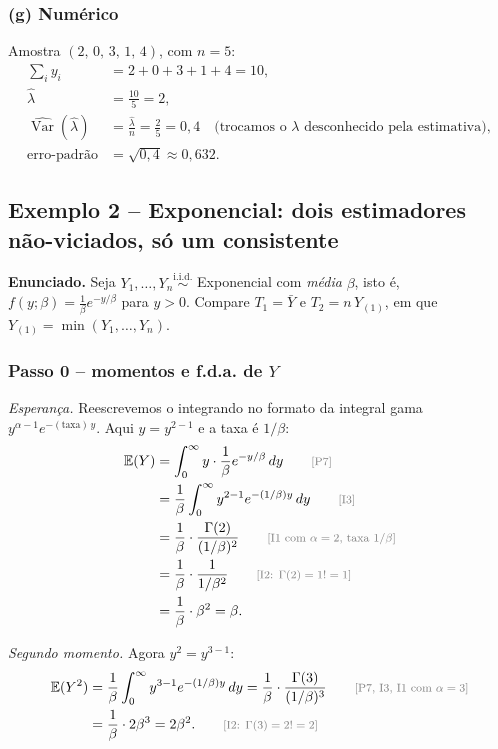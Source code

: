 \documentclass[11pt,a4paper]{article}
\theoremstyle{definition}
\theoremstyle{plain}
\newcommand{\E}{\mathbb{E}}
\newcommand{\Var}{\operatorname{Var}}
\newcommand{\iid}{\overset{\text{i.i.d.}}{\sim}}
\newcommand{\bY}{\bar{Y}}
\newcommand{\just}[1]{\tag*{\footnotesize\textcolor{gray}{[#1]}}}
\begin{document}
\subsubsection*{(g) Numérico}
Amostra $(2,\,0,\,3,\,1,\,4)$, com $n=5$:
\begin{align*}
\sum_iy_i&=2+0+3+1+4=10,\\
\hat\lambda&=\frac{10}{5}=2,\\
\widehat{\Var}(\hat\lambda)&=\frac{\hat\lambda}{n}=\frac{2}{5}=0{,}4 \quad\text{(trocamos o $\lambda$ desconhecido pela estimativa)},\\
\text{erro-padrão}&=\sqrt{0{,}4}\approx0{,}632 .
\end{align*}

\subsection{Exemplo 2 -- Exponencial: dois estimadores não-viciados, só um consistente}\label{ex:expo}

\textbf{Enunciado.} Seja $Y_1,\dots,Y_n\iid$ Exponencial com \emph{média} $\beta$, isto é, $f(y;\beta)=\frac1\beta e^{-y/\beta}$ para $y>0$. Compare $T_1=\bY$ e $T_2=n\,Y_{(1)}$, em que $Y_{(1)}=\min(Y_1,\dots,Y_n)$.

\subsubsection*{Passo 0 -- momentos e f.d.a. de $Y$}

\textit{Esperança.} Reescrevemos o integrando no formato da integral gama $y^{\alpha-1}e^{-(\text{taxa})\,y}$. Aqui $y=y^{2-1}$ e a taxa é $1/\beta$:
\begin{align*}
\E(Y)&=\int_0^\infty y\cdot\frac1\beta e^{-y/\beta}\,dy \just{P7}\\
&=\frac1\beta\int_0^\infty y^{2-1}e^{-(1/\beta)y}\,dy \just{I3}\\
&=\frac1\beta\cdot\frac{\Gamma(2)}{(1/\beta)^2} \just{I1 com $\alpha=2$, taxa $1/\beta$}\\
&=\frac1\beta\cdot\frac{1}{1/\beta^2} \just{I2: $\Gamma(2)=1!=1$}\\
&=\frac1\beta\cdot\beta^2=\beta .
\end{align*}

\textit{Segundo momento.} Agora $y^2=y^{3-1}$:
\begin{align*}
\E(Y^2)&=\frac1\beta\int_0^\infty y^{3-1}e^{-(1/\beta)y}\,dy
=\frac1\beta\cdot\frac{\Gamma(3)}{(1/\beta)^3} \just{P7, I3, I1 com $\alpha=3$}\\
&=\frac1\beta\cdot2\beta^3=2\beta^2 . \just{I2: $\Gamma(3)=2!=2$}
\end{align*}
\end{document}
